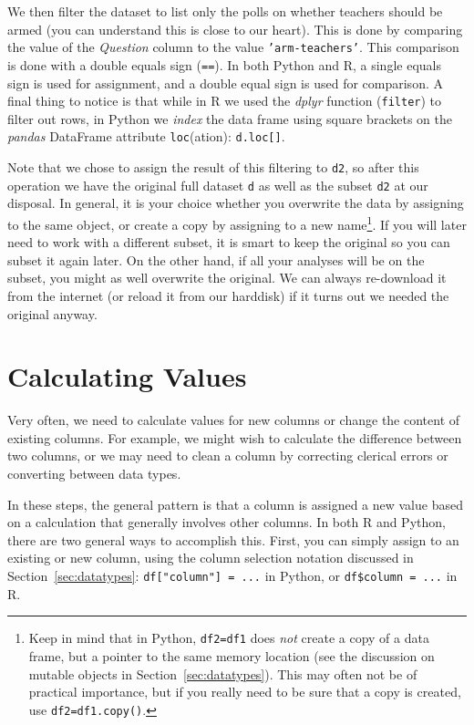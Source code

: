 We then filter the dataset to list only the polls on whether teachers should be armed
(you can understand this is close to our heart).
This is done by comparing the value of the \emph{Question} column to the value \texttt{'arm-teachers'}.
This comparison is done with a double equals sign (\verb+==+).
In both Python and R, a single equals sign is used for assignment,
and a double equal sign is used for comparison.
A final thing to notice is that while in R we used the \emph{dplyr} function (\texttt{filter}) to filter out rows,
in Python we \emph{index} the data frame using square brackets on the \emph{pandas} DataFrame attribute \texttt{loc}(ation): \verb+d.loc[]+.

Note that we chose to assign the result of this filtering to \texttt{d2},
so after this operation we have the original full dataset \texttt{d} as well as the subset \texttt{d2} at our disposal.
In general, it is your choice whether you overwrite the data by assigning to the same object,
or create a copy by assigning to a new name\footnote{Keep in mind that in Python, \texttt{\small{df2=df1}} does \emph{not} create a copy of a data frame, but a pointer to the same memory location (see the discussion on mutable objects in Section~\ref{sec:datatypes}). This may often not be of practical importance, but if you really need to be sure that a copy is created, use \texttt{\small{df2=df1.copy()}}.}.
If you will later need to work with a different subset, it is smart to keep the original so you can subset it again later.
On the other hand, if all your analyses will be on the subset, you might as well overwrite the original.
We can always re-download it from the internet (or reload it from our harddisk) if it turns out we needed the original anyway.


\section{Calculating Values}
\label{sec:calculate}

Very often, we need to calculate values for new columns or change the content of existing columns.
For example, we might wish to calculate the difference between two columns,
or we may need to clean a column by correcting clerical errors or converting between data types.

In these steps, the general pattern is that a column is assigned a new value based on
a calculation that generally involves other columns.
In both R and Python, there are two general ways to accomplish this.
First, you can simply assign to an existing or new column,
using the column selection notation discussed in Section~\ref{sec:datatypes}:
\verb+df["column"] = ...+ in Python, or \verb+df$column = ...+ in R.

